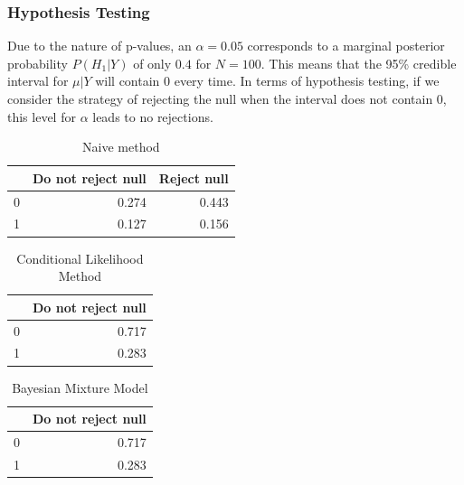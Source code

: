 \documentclass[AMA,STIX1COL]{WileyNJD-v2}\usepackage[]{graphicx}\usepackage[]{color}
\newenvironment{knitrout}{}{} %
\begin{document}
\subsubsection{Hypothesis Testing}


Due to the nature of p-values, an $\alpha = 0.05$ corresponds to a marginal posterior probability $P(H_1 | Y )$ of only $0.4$ for $N = 100$. This means that the 95\% credible interval for $\mu| Y$ will contain 0 every time. In terms of hypothesis testing, if we consider the strategy of rejecting the null when the interval does not contain 0, this level for $\alpha$ leads to no rejections.

\begin{knitrout}
\color{fgcolor}\begin{table}

\caption{\label{tab:unnamed-chunk-10}Naive method}
\centering
\begin{tabular}[t]{l|r|r}
\hline
  & Do not reject null & Reject null\\
\hline
0 & 0.274 & 0.443\\
\hline
1 & 0.127 & 0.156\\
\hline
\end{tabular}
\end{table}


\end{knitrout}

\begin{knitrout}
\color{fgcolor}\begin{table}

\caption{\label{tab:unnamed-chunk-11}Conditional Likelihood Method}
\centering
\begin{tabular}[t]{l|r}
\hline
  & Do not reject null\\
\hline
0 & 0.717\\
\hline
1 & 0.283\\
\hline
\end{tabular}
\end{table}


\end{knitrout}

\begin{knitrout}
\color{fgcolor}\begin{table}

\caption{\label{tab:unnamed-chunk-12}Bayesian Mixture Model}
\centering
\begin{tabular}[t]{l|r}
\hline
  & Do not reject null\\
\hline
0 & 0.717\\
\hline
1 & 0.283\\
\hline
\end{tabular}
\end{table}


\end{knitrout}
\end{document}
